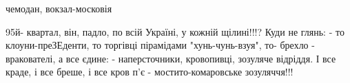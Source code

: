 \begin{itemize}
чемодан, вокзал-московія

 

95й- квартал, він, падло, по всій Україні, у кожній щілині!!!? Куди не глянь: -
то клоуни-преЗЕденти, то торгівці пірамідами "хунь-чунь-взуя", то- брехло -
вракователі, а все єдине: - наперсточники, кровопивці, зозуляче відріддя. І все
краде, і все бреше, і все кров п'є - мостито-комаровське зозуляччя!!!
\end{itemize}

